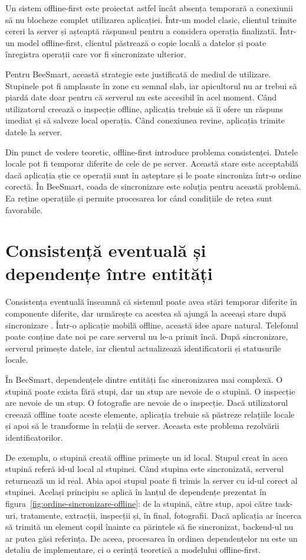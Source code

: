 Un sistem offline-first este proiectat astfel încât absența temporară a conexiunii să nu blocheze complet utilizarea aplicației. Într-un model clasic, clientul trimite cereri la server și așteaptă răspunsul pentru a considera operația finalizată. Într-un model offline-first, clientul păstrează o copie locală a datelor și poate înregistra operații care vor fi sincronizate ulterior.

Pentru BeeSmart, această strategie este justificată de mediul de utilizare. Stupinele pot fi amplasate în zone cu semnal slab, iar apicultorul nu ar trebui să piardă date doar pentru că serverul nu este accesibil în acel moment. Când utilizatorul creează o inspecție offline, aplicația trebuie să îi ofere un răspuns imediat și să salveze local operația. Când conexiunea revine, aplicația trimite datele la server.

Din punct de vedere teoretic, offline-first introduce problema consistenței. Datele locale pot fi temporar diferite de cele de pe server. Această stare este acceptabilă dacă aplicația știe ce operații sunt în așteptare și le poate sincroniza într-o ordine corectă. În BeeSmart, coada de sincronizare este soluția pentru această problemă. Ea reține operațiile și permite procesarea lor când condițiile de rețea sunt favorabile.

\section{Consistență eventuală și dependențe între entități}

Consistența eventuală înseamnă că sistemul poate avea stări temporar diferite în componente diferite, dar urmărește ca acestea să ajungă la aceeași stare după sincronizare \cite{vogelsEventualConsistency}. Într-o aplicație mobilă offline, această idee apare natural. Telefonul poate conține date noi pe care serverul nu le-a primit încă. După sincronizare, serverul primește datele, iar clientul actualizează identificatorii și statusurile locale.

În BeeSmart, dependențele dintre entități fac sincronizarea mai complexă. O stupină poate exista fără stupi, dar un stup are nevoie de o stupină. O inspecție are nevoie de un stup. O fotografie are nevoie de o inspecție. Dacă utilizatorul creează offline toate aceste elemente, aplicația trebuie să păstreze relațiile locale și apoi să le transforme în relații de server. Aceasta este problema rezolvării identificatorilor.

De exemplu, o stupină creată offline primește un id local. Stupul creat în acea stupină referă id-ul local al stupinei. Când stupina este sincronizată, serverul returnează un id real. Abia apoi stupul poate fi trimis la server cu id-ul corect al stupinei. Același principiu se aplică în lanțul de dependențe prezentat în figura~\ref{fig:ordine-sincronizare-offline}: de la stupină, către stup, apoi către task-uri, tratamente, extracții, inspecții și, în final, fotografii. Dacă aplicația ar încerca să trimită un element copil înainte ca părintele să fie sincronizat, backend-ul nu ar putea găsi referința. De aceea, procesarea în ordinea dependențelor nu este un detaliu de implementare, ci o cerință teoretică a modelului offline-first.

